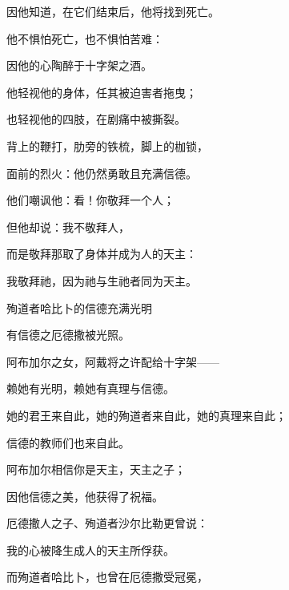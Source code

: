 因他知道，在它们结束后，他将找到死亡。\par

他不惧怕死亡，也不惧怕苦难：\par

因他的心陶醉于十字架之酒。\par

他轻视他的身体，任其被迫害者拖曳；\par

也轻视他的四肢，在剧痛中被撕裂。\par

背上的鞭打，肋旁的铁梳，脚上的枷锁，\par

面前的烈火：他仍然勇敢且充满信德。\par

他们嘲讽他：看！你敬拜一个人；\par

但他却说：我不敬拜人，\par

而是敬拜那取了身体并成为人的天主：\par

我敬拜祂，因为祂与生祂者同为天主。\par

殉道者哈比卜的信德充满光明\par

有信德之厄德撒被光照。\par

阿布加尔之女，阿戴将之许配给十字架——\par

赖她有光明，赖她有真理与信德。\par

她的君王来自此，她的殉道者来自此，她的真理来自此；\par

信德的教师们也来自此。\par

阿布加尔相信你是天主，天主之子；\par

因他信德之美，他获得了祝福。\par

厄德撒人之子、殉道者沙尔比勒更曾说：\par

我的心被降生成人的天主所俘获。\par

而殉道者哈比卜，也曾在厄德撒受冠冕，\par

